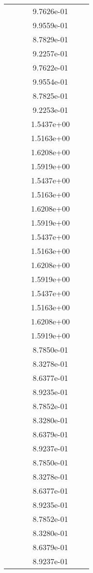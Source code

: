 \begin{xltabular}{\textwidth}{r|rS[table-format=1.3e+2]S[table-format=1.4e+2]S[table-format=1.4e+2]S[table-format=-1.5]}
&  &  & 9.7626e-01 & & \\
&  &  & 9.9559e-01 & & \\
&  &  & 8.7829e-01 & & \\
&  &  & 9.2257e-01 & & \\
&  &  & 9.7622e-01 & & \\
&  &  & 9.9554e-01 & & \\
&  &  & 8.7825e-01 & & \\
&  &  & 9.2253e-01 & & \\
&  &  & 1.5437e+00 & & \\
&  &  & 1.5163e+00 & & \\
&  &  & 1.6208e+00 & & \\
&  &  & 1.5919e+00 & & \\
&  &  & 1.5437e+00 & & \\
&  &  & 1.5163e+00 & & \\
&  &  & 1.6208e+00 & & \\
&  &  & 1.5919e+00 & & \\
&  &  & 1.5437e+00 & & \\
&  &  & 1.5163e+00 & & \\
&  &  & 1.6208e+00 & & \\
&  &  & 1.5919e+00 & & \\
&  &  & 1.5437e+00 & & \\
&  &  & 1.5163e+00 & & \\
&  &  & 1.6208e+00 & & \\
&  &  & 1.5919e+00 & & \\
&  &  & 8.7850e-01 & & \\
&  &  & 8.3278e-01 & & \\
&  &  & 8.6377e-01 & & \\
&  &  & 8.9235e-01 & & \\
&  &  & 8.7852e-01 & & \\
&  &  & 8.3280e-01 & & \\
&  &  & 8.6379e-01 & & \\
&  &  & 8.9237e-01 & & \\
&  &  & 8.7850e-01 & & \\
&  &  & 8.3278e-01 & & \\
&  &  & 8.6377e-01 & & \\
&  &  & 8.9235e-01 & & \\
&  &  & 8.7852e-01 & & \\
&  &  & 8.3280e-01 & & \\
&  &  & 8.6379e-01 & & \\
&  &  & 8.9237e-01 & & \\

\end{xltabular}
